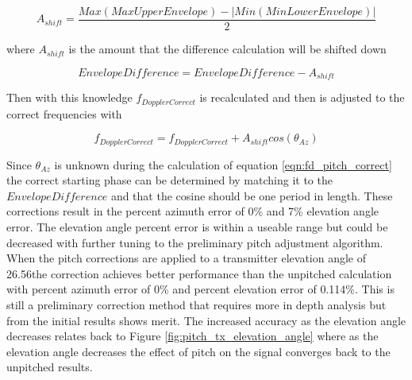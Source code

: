 \begin{equation}
	A_{shift} = \frac{Max(Max Upper Envelope) - |Min(Min Lower Envelope)|}{2}
	\label{eqn:pitch_shift}
\end{equation}

where $A_{shift}$ is the amount that the difference calculation will be shifted down

\begin{equation}
	EnvelopeDifference = EnvelopeDifference - A_{shift}
	\label{eqn:diff_shift}
\end{equation}

Then with this knowledge $f_{DopplerCorrect}$ is recalculated and then is adjusted to the correct frequencies with

\begin{equation}
	f_{DopplerCorrect} = f_{DopplerCorrect} + A_{shift}cos\left(\theta_{Az}\right)
	\label{eqn:fd_pitch_correct}
\end{equation}

Since $\theta_{Az}$ is unknown during the calculation of equation \ref{eqn:fd_pitch_correct} the correct starting phase can be determined by matching it to the $EnvelopeDifference$ and that the cosine should be one period in length. These corrections result in the percent azimuth error of 0\% and 7\% elevation angle error. The elevation angle percent error is within a useable range but could be decreased with further tuning to the preliminary pitch adjustment algorithm. When the pitch corrections are applied to a transmitter elevation angle of 26.56\textdegree \space the correction achieves better performance than the unpitched calculation with percent azimuth error of 0\% and percent elevation error of 0.114\%. This is still a preliminary correction method that requires more in depth analysis but from the initial results shows merit. The increased accuracy as the elevation angle decreases relates back to Figure \ref{fig:pitch_tx_elevation_angle} where as the elevation angle decreases the effect of pitch on the signal converges back to the unpitched results.



